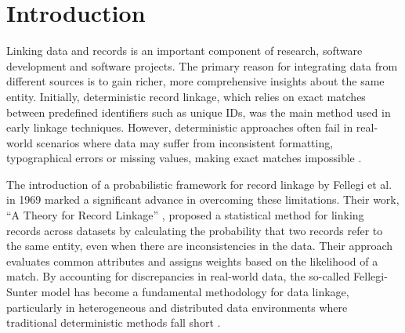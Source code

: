 \chapter{Introduction}  \label{sec:introduction}

%


Linking data and records is an important component of research, software development and software projects.
The primary reason for integrating data from different sources is to gain richer, more comprehensive insights about the same entity.
Initially, deterministic record linkage, which relies on exact matches between predefined identifiers such as unique IDs, was the main method used in early linkage techniques.
However, deterministic approaches often fail in real-world scenarios where data may suffer from inconsistent formatting, typographical errors or missing values, making exact matches impossible \cite{herzog2007data}.

The introduction of a probabilistic framework for record linkage by Fellegi et al. in 1969 \cite{fellegi1969theory} marked a significant advance in overcoming these limitations.
Their work, \enquote{A Theory for Record Linkage} \cite{fellegi1969theory}, proposed a statistical method for linking records across datasets by calculating the probability that two records refer to the same entity, even when there are inconsistencies in the data.
Their approach evaluates common attributes and assigns weights based on the likelihood of a match.
By accounting for discrepancies in real-world data, the so-called Fellegi-Sunter model has become a fundamental methodology for data linkage, particularly in heterogeneous and distributed data environments where traditional deterministic methods fall short \cite{fellegi1969theory}.

